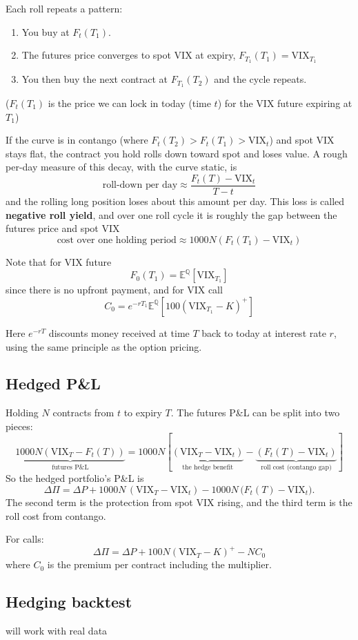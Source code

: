 \documentclass[12pt]{article}
\begin{document}
Each roll repeats a pattern:
\begin{enumerate}
    \item You buy at $F_t (T_1)$.
    \item The futures price converges to spot VIX at expiry, $F_{T_1}(T_1) = \mathrm{VIX}_{T_1}$
    \item You then buy the next contract at $F_{T_1}(T_2)$ and the cycle repeats.
\end{enumerate}
($F_t(T_1)$ is the price we can lock in today (time $t$) for the VIX future expiring at $T_1$)

If the curve is in contango (where $F_t(T_2) > F_t(T_1) > \mathrm{VIX}_t$) and spot VIX stays flat, the contract you hold rolls down toward spot and loses value. A rough per-day measure of this decay, with the curve static, is
\[
    \text{roll-down per day} \approx \dfrac{F_t(T) - \mathrm{VIX}_t}{T - t}
\]
and the rolling long position loses about this amount per day. This loss is called \textbf{negative roll yield}, and over one roll cycle it is roughly the gap between the futures price and spot VIX
\[
    \text{cost over one holding period} \approx 1000 N (F_t(T_1) - \mathrm{VIX}_t)
\]

Note that for VIX future
\[
    F_0(T_1) = \mathbb{E}^{\mathbb{Q}}[\mathrm{VIX}_{T_1}]
\]
since there is no upfront payment, and for VIX call
\[
    C_0 = e^{-rT_1} \mathbb{E}^{\mathbb{Q}}[100(\mathrm{VIX}_{T_1} - K)^+]
\]

Here $e^{-rT}$ discounts money received at time $T$ back to today at interest rate $r$, using the same principle as the option pricing.

\subsection{Hedged P\&L}
Holding $N$ contracts from $t$ to expiry $T$. The futures P\&L can be split into two pieces:
\[
    \underbrace{1000 N (\mathrm{VIX}_T - F_t(T))}_{\text{futures P\&L}} = 1000 N\left[\underbrace{(\mathrm{VIX}_T - \mathrm{VIX}_t)}_{\text{the hedge benefit}} - \underbrace{(F_t(T) - \mathrm{VIX}_t)}_{\text{roll cost (contango gap)}}\right]
\]
So the hedged portfolio's P\&L is
\[
    \Delta\Pi = \Delta P
    + 1000N\,(\mathrm{VIX}_T - \mathrm{VIX}_t)
    - 1000N\,\bigl(F_t(T) - \mathrm{VIX}_t\bigr).
\]
The second term is the protection from spot VIX rising, and the third term is the
roll cost from contango.

For calls:
\[
    \Delta \Pi = \Delta P + 100 N (\mathrm{VIX}_T - K)^+ - N C_0
\]
where $C_0$ is the premium per contract including the multiplier.

\subsection{Hedging backtest}
will work with real data
\end{document}
